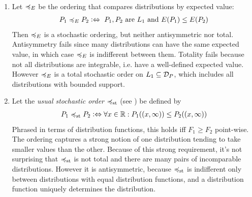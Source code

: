 \documentclass[a4paper]{scrreprt}
\begin{document}
    \begin{ex}~
        \begin{enumerate}
            \item 
            Let $\preccurlyeq_E$ be the ordering that compares distributions by expected value:
            \begin{gather*}
                P_1 \preccurlyeq_E P_2 \mathrel{\vcentcolon\Leftrightarrow} \text{ $P_1, P_2$ are $L_1$ and $E(P_1) \leq E(P_2)$} 
            \end{gather*}
            Then $\preccurlyeq_E$ is a stochastic ordering, but neither antisymmetric nor total. Antisymmetry fails since many distributions can have the same expected value, in which case $\preccurlyeq_E$ is indifferent between them. Totality fails because not all distributions are integrable, i.e. have a well-defined expected value. However $\preccurlyeq_E$ is a total stochastic order on $L_1 \subseteq \mathcal{D}_P$, which includes all distributions with bounded support.
            
            \item Let the \emph{usual stochastic order} $\preccurlyeq_{\text{st}}$ (see \cite{bib:shakedStochasticOrders}) be defined by 
            \begin{gather*}
                P_1 \preccurlyeq_{\text{st}} P_2 \mathrel{\vcentcolon\Leftrightarrow} \forall x \in \mathbb{R}: P_1((x, \infty)) \leq P_2((x, \infty))
            \end{gather*}
            Phrased in terms of distribution functions, this holds iff $F_1 \geq F_2$ point-wise. The ordering captures a strong notion of one distribution tending to take smaller values than the other. Because of this strong requirement, it's not surprising that $\preccurlyeq_{\text{st}}$ is not total and there are many pairs of incomparable distributions. However it is antisymmetric, because $\preccurlyeq_{\text{st}}$ is indifferent only between distributions with equal distribution functions, and a distribution function uniquely determines the distribution.
        \end{enumerate}
    \end{ex}

    \let\dpref\dgeq
    \let\dnonpref\dleq
    \let\dstrpref\dgreater
    \let\dstrnonpref\dless
    
\end{document}
